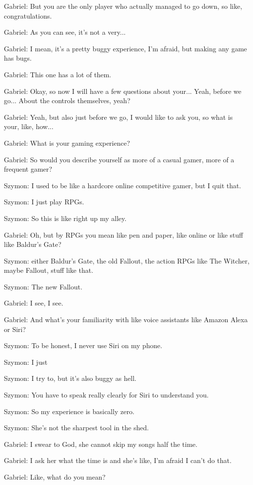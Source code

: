 Gabriel: But you are the only player who actually managed to go down, so like, congratulations.

Gabriel: As you can see, it's not a very...

Gabriel: I mean, it's a pretty buggy experience, I'm afraid, but making any game has bugs.

Gabriel: This one has a lot of them.

Gabriel: Okay, so now I will have a few questions about your... Yeah, before we go... About the controls themselves, yeah?

Gabriel: Yeah, but also just before we go, I would like to ask you, so what is your, like, how...

Gabriel: What is your gaming experience?

Gabriel: So would you describe yourself as more of a casual gamer, more of a frequent gamer?

Szymon: I used to be like a hardcore online competitive gamer, but I quit that.

Szymon: I just play RPGs.

Szymon: So this is like right up my alley.

Gabriel: Oh, but by RPGs you mean like pen and paper, like online or like stuff like Baldur's Gate?

Szymon: either Baldur's Gate, the old Fallout, the action RPGs like The Witcher, maybe Fallout, stuff like that.

Szymon: The new Fallout.

Gabriel: I see, I see.

Gabriel: And what's your familiarity with like voice assistants like Amazon Alexa or Siri?

Szymon: To be honest, I never use Siri on my phone.

Szymon: I just

Szymon: I try to, but it's also buggy as hell.

Szymon: You have to speak really clearly for Siri to understand you.

Szymon: So my experience is basically zero.

Szymon: She's not the sharpest tool in the shed.

Gabriel: I swear to God, she cannot skip my songs half the time.

Gabriel: I ask her what the time is and she's like, I'm afraid I can't do that.

Gabriel: Like, what do you mean?

